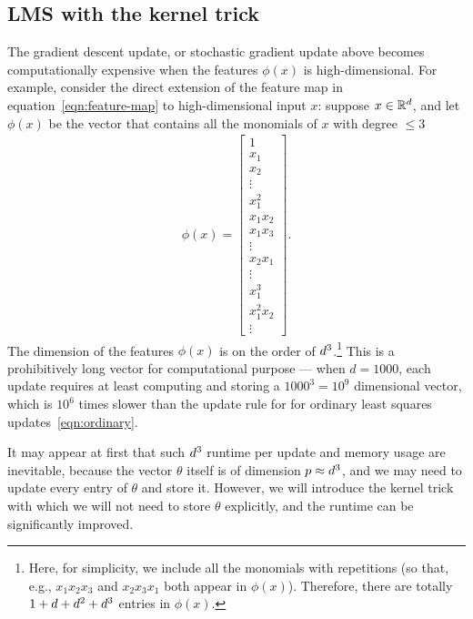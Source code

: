 \documentclass{article}
\begin{document}
\subsection{LMS with the kernel trick}

The  gradient descent update, or stochastic gradient update above becomes computationally expensive when the features $\phi(x)$ is high-dimensional. For example, consider the direct extension of the feature map in equation~\eqref{eqn:feature-map} to high-dimensional input $x$: suppose $x\in \mathbb{R}^{d}$, and let $\phi(x)$ be the vector that contains all the monomials of $x$ with degree $\le 3$
\begin{align}
\phi(x) = \left[\begin{array}{c}
1\\
x_1  \\
x_2 \\
\vdots \\
x_1^2 \\
x_1x_2 \\
x_1 x_3 \\
\vdots \\
x_2x_1\\
\vdots\\
x_1^3\\
x_1^2x_2 \\
\vdots
\end{array}\right].\label{eqn:featuremap}
\end{align}
The dimension of the features $\phi(x)$ is on the order of ${d}^3$.\footnote{Here, for simplicity, we include all the monomials with repetitions (so that, e.g., $x_1x_2x_3$ and $x_2x_3x_1$ both appear in $\phi(x)$). Therefore, there are totally $1+{d} + {d}^2 + {d}^3$ entries in $\phi(x)$.} This is a prohibitively long vector for computational purpose --- when $d = 1000$, each update requires at least computing and storing a $1000^3= 10^9$ dimensional vector, which is $10^6$ times slower than the update rule for for ordinary least squares updates~\eqref{eqn:ordinary}. 

It may appear at first that such ${d}^3$ runtime per update and memory usage are inevitable, because the vector $\theta$ itself is of dimension $p \approx {d}^3$, and we may need to update every entry of $\theta$ and store it. However, we will introduce the kernel trick with which we will not need to store $\theta$ explicitly, and the runtime can be significantly improved. 
\end{document}
